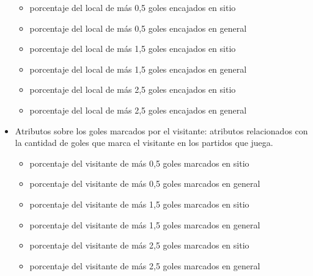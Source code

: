 \begin{itemize}
    \begin{itemize}
        \item porcentaje del local de más 0,5 goles encajados en sitio
        \item porcentaje del local de más 0,5 goles encajados en general
        \item porcentaje del local de más 1,5 goles encajados en sitio
        \item porcentaje del local de más 1,5 goles encajados en general
        \item porcentaje del local de más 2,5 goles encajados en sitio
        \item porcentaje del local de más 2,5 goles encajados en general
    \end{itemize}
    \item Atributos sobre los goles marcados por el visitante: atributos relacionados con la cantidad de goles que marca el visitante en los partidos que juega.
    \begin{itemize}
        \item porcentaje del visitante de más 0,5 goles marcados en sitio
        \item porcentaje del visitante de más 0,5 goles marcados en general
        \item porcentaje del visitante de más 1,5 goles marcados en sitio
        \item porcentaje del visitante de más 1,5 goles marcados en general
        \item porcentaje del visitante de más 2,5 goles marcados en sitio
        \item porcentaje del visitante de más 2,5 goles marcados en general
        

\end{itemize}
\end{itemize}
